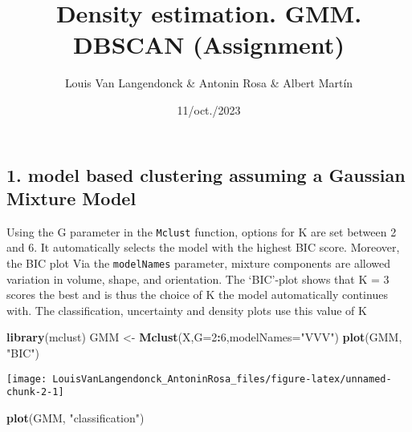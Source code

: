 \documentclass[
]{article}
\title{Density estimation. GMM. DBSCAN (Assignment)}
\author{Louis Van Langendonck \& Antonin Rosa \& Albert Martín}
\date{11/oct./2023}
\newenvironment{Shaded}{\begin{snugshade}}{\end{snugshade}}
\newcommand{\AttributeTok}[1]{\textcolor[rgb]{0.13,0.29,0.53}{#1}}
\newcommand{\CommentTok}[1]{\textcolor[rgb]{0.56,0.35,0.01}{\textit{#1}}}
\newcommand{\DecValTok}[1]{\textcolor[rgb]{0.00,0.00,0.81}{#1}}
\newcommand{\FunctionTok}[1]{\textcolor[rgb]{0.13,0.29,0.53}{\textbf{#1}}}
\newcommand{\NormalTok}[1]{#1}
\newcommand{\OtherTok}[1]{\textcolor[rgb]{0.56,0.35,0.01}{#1}}
\newcommand{\SpecialCharTok}[1]{\textcolor[rgb]{0.81,0.36,0.00}{\textbf{#1}}}
\newcommand{\StringTok}[1]{\textcolor[rgb]{0.31,0.60,0.02}{#1}}
\begin{document}
\maketitle

\begin{Shaded}
\end{Shaded}

\hypertarget{model-based-clustering-assuming-a-gaussian-mixture-model}{%
\subsection{1. model based clustering assuming a Gaussian Mixture
Model}\label{model-based-clustering-assuming-a-gaussian-mixture-model}}

Using the G parameter in the \texttt{Mclust} function, options for K are
set between 2 and 6. It automatically selects the model with the highest
BIC score. Moreover, the BIC plot Via the \texttt{modelNames} parameter,
mixture components are allowed variation in volume, shape, and
orientation. The `BIC'-plot shows that K = 3 scores the best and is thus
the choice of K the model automatically continues with. The
classification, uncertainty and density plots use this value of K

\begin{Shaded}
\begin{Highlighting}[]
\FunctionTok{library}\NormalTok{(mclust)}
\NormalTok{GMM }\OtherTok{\textless{}{-}} \FunctionTok{Mclust}\NormalTok{(X,}\AttributeTok{G=}\DecValTok{2}\SpecialCharTok{:}\DecValTok{6}\NormalTok{,}\AttributeTok{modelNames=}\StringTok{"VVV"}\NormalTok{)}
\FunctionTok{plot}\NormalTok{(GMM, }\StringTok{"BIC"}\NormalTok{)}
\end{Highlighting}
\end{Shaded}

\texttt{[image: LouisVanLangendonck\_AntoninRosa\_files/figure-latex/unnamed-chunk-2-1]}

\begin{Shaded}
\begin{Highlighting}[]
\FunctionTok{plot}\NormalTok{(GMM, }\StringTok{"classification"}\NormalTok{)}
\end{Highlighting}
\end{Shaded}
\end{document}
